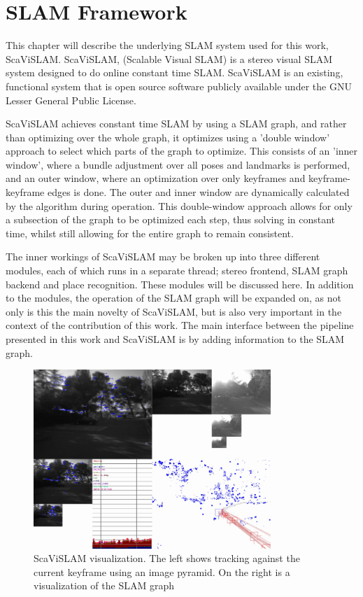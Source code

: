 \chapter{SLAM Framework}
\label{chapter:ScaViSLAM}

This chapter will describe the underlying SLAM system used for this work, \\ \mbox{ScaViSLAM}\cite{strasdat_11}.  \mbox{ScaViSLAM}, (Scalable Visual SLAM) is a stereo visual SLAM system designed to do online constant time SLAM.  ScaViSLAM is an existing, functional system that is open source software publicly available under the GNU Lesser General Public License.

ScaViSLAM achieves constant time SLAM by using a SLAM graph, and rather than optimizing over the whole graph, it optimizes using a 'double window' approach to select which parts of the graph to optimize.  This consists of an 'inner window', where a bundle adjustment over all poses and landmarks is performed, and an outer window, where an optimization over only keyframes and keyframe-keyframe edges is done. The outer and inner window are dynamically calculated by the algorithm during operation.  This double-window approach allows for only a subsection of the graph to be optimized each step, thus solving in constant time, whilst still allowing for the entire graph to remain consistent.

The inner workings of ScaViSLAM may be broken up into three different modules, each of which runs in a separate thread; stereo frontend, SLAM graph backend and place recognition. These modules will be discussed here. In addition to the modules, the operation of the SLAM graph will be expanded on, as not only is this the main novelty of ScaViSLAM, but is also very important in the context of the contribution of this work. The main interface between the pipeline presented in this work and ScaViSLAM is by adding information to the SLAM graph.

\begin{figure}[h!]
  \centering
    \includegraphics[width=0.8\textwidth]{chapters/images/scavislam_gui}
    \caption{ScaViSLAM visualization.  The left shows tracking against the current keyframe using an image pyramid.  On the right is a visualization of the SLAM graph}
  \label{fig:scavislam_gui}
\end{figure}

